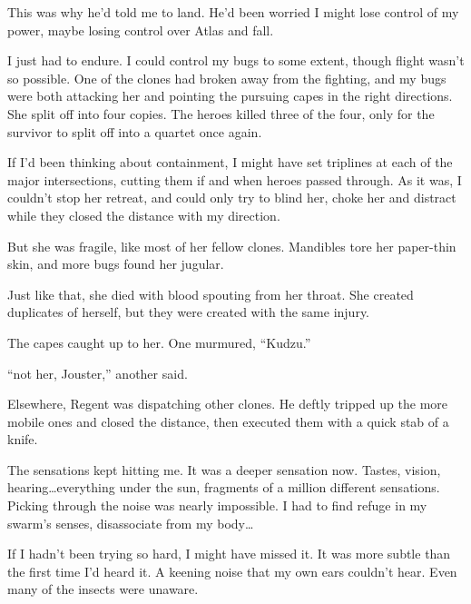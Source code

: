 This was why he'd told me to land.  He'd been worried I might lose control of my power, maybe losing control over Atlas and fall.



I just had to endure.  I could control my bugs to some extent, though flight wasn't so possible.  One of the clones had broken away from the fighting, and my bugs were both attacking her and pointing the pursuing capes in the right directions.  She split off into four copies.  The heroes killed three of the four, only for the survivor to split off into a quartet once again.



If I'd been thinking about containment, I might have set triplines at each of the major intersections, cutting them if and when heroes passed through.  As it was, I couldn't stop her retreat, and could only try to blind her, choke her and distract while they closed the distance with my direction.



But she was fragile, like most of her fellow clones.  Mandibles tore her paper-thin skin, and more bugs found her jugular.



Just like that, she died with blood spouting from her throat.  She created duplicates of herself, but they were created with the same injury.



The capes caught up to her.  One murmured, ``Kudzu.''



``\ldotss not her, Jouster,'' another said.



Elsewhere, Regent was dispatching other clones.  He deftly tripped up the more mobile ones and closed the distance, then executed them with a quick stab of a knife.



The sensations kept hitting me.  It was a deeper sensation now.  Tastes, vision, hearing\ldots everything under the sun, fragments of a million different sensations.  Picking through the noise was nearly impossible.  I had to find refuge in my swarm's senses, disassociate from my body\ldots



If I hadn't been trying so hard, I might have missed it.  It was more subtle than the first time I'd heard it.  A keening noise that my own ears couldn't hear.  Even many of the insects were unaware.



